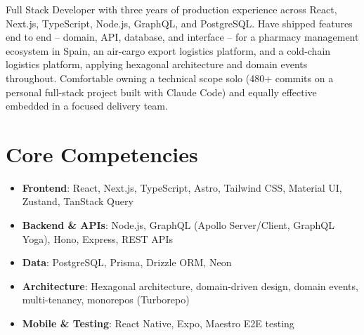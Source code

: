 \documentclass[11pt,a4paper,sans]{moderncv}
\begin{document}
\makecvtitle


\vspace{6pt}
\small{Full Stack Developer with three years of production experience across React, Next.js, TypeScript, Node.js, GraphQL, and PostgreSQL. Have shipped features end to end -- domain, API, database, and interface -- for a pharmacy management ecosystem in Spain, an air-cargo export logistics platform, and a cold-chain logistics platform, applying hexagonal architecture and domain events throughout. Comfortable owning a technical scope solo (480+ commits on a personal full-stack project built with Claude Code) and equally effective embedded in a focused delivery team.}


\section{Core Competencies}
\vspace{1pt}
\begin{itemize}

\item \textbf{Frontend}: React, Next.js, TypeScript, Astro, Tailwind CSS, Material UI, Zustand, TanStack Query

\item \textbf{Backend \& APIs}: Node.js, GraphQL (Apollo Server/Client, GraphQL Yoga), Hono, Express, REST APIs

\item \textbf{Data}: PostgreSQL, Prisma, Drizzle ORM, Neon

\item \textbf{Architecture}: Hexagonal architecture, domain-driven design, domain events, multi-tenancy, monorepos (Turborepo)

\item \textbf{Mobile \& Testing}: React Native, Expo, Maestro E2E testing

\end{itemize}

\end{document}
